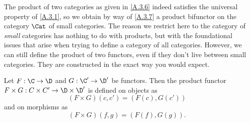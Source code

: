 \begin{construction}\label{A.3.10}
    The product of two categories as given in \cref{A.3.6} indeed satisfies the universal property of \cref{A.3.1}, so we obtain by way of \cref{A.3.7} a product bifunctor on the category $\Cat$ of small categories. The reason we restrict here to the category of \emph{small} categories has nothing to do with products, but with the foundational issues that arise when trying to define a category of all categories. However, we can still define the product of two functors, even if they don't live between small categories. They are constructed in the exact way you would expect.

    Let $F : \C\to\D$ and $G : \C'\to\D'$ be functors. Then the product functor $F\times G : C\times C' \to \D\times\D'$ is defined on objects as
    \[
    (F\times G)(c,c')=(F(c),G(c'))
    \]
    and on morphisms as
    \[
    (F\times G)(f,g)=(F(f),G(g)).
    \]
\end{construction}